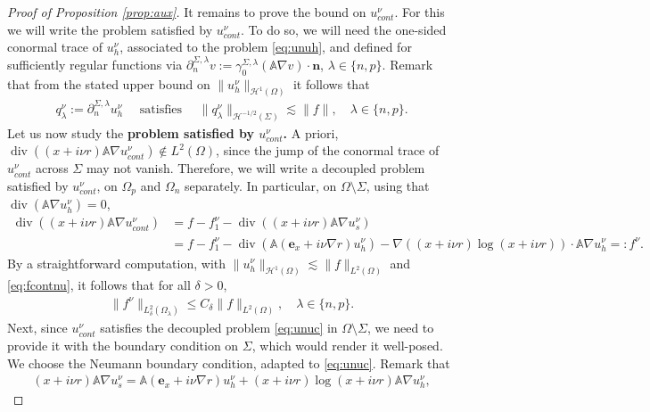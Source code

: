 \documentclass[report]{elsarticle}
\numberwithin{theorem}{section}
\renewcommand{\vec}[1]{\mathbf{#1}}
\begin{document}
\begin{proof}[Proof of Proposition \ref{prop:aux}]
	It remains to prove the bound on $u^{\nu}_{cont}$. For this we will write the problem satisfied by $u^{\nu}_{cont}$.  To do so, we will need the one-sided conormal trace of $u^{\nu}_h$, associated to the problem \eqref{eq:unuh}, and defined for sufficiently regular functions via $\partial_{n}^{\Sigma,\lambda}v:=\gamma_0^{\Sigma,\lambda}(\mathbb{A}\nabla v)\cdot \vec{n}$, $\lambda\in \{n,p\}$. Remark that from the stated upper bound on $\|u^{\nu}_h\|_{\mathcal{H}^1(\Omega)}$ it follows that
	\begin{align}
		\label{eq:conorm_der}
		q^{\nu}_{\lambda}:=\partial_{n}^{\Sigma,\lambda}u^{\nu}_h\quad \text{ satisfies }\quad
		\|q^{\nu}_{\lambda}\|_{\mathcal{H}^{-1/2}(\Sigma)}\lesssim \|f\|, \quad \lambda\in \{n,p\}.
	\end{align}
	Let us now study the \textbf{problem satisfied by $u^{\nu}_{cont}$.} A priori, $\operatorname{div}((x+i\nu r)\mathbb{A}\nabla u^{\nu}_{cont})\notin L^2(\Omega)$, since the jump of the conormal trace of $u^{\nu}_{cont}$ across $\Sigma$ may not vanish. Therefore, we will write a decoupled problem satisfied by $u^{\nu}_{cont}$, on $\Omega_p$ and $\Omega_n$ separately. In particular, on $\Omega\setminus \Sigma$, using that $\operatorname{div}(\mathbb{A}\nabla u^{\nu}_h)=0$, 
	\begin{align}
		\nonumber
		\operatorname{div}((x+i\nu r)\mathbb{A}\nabla u^{\nu}_{cont})&=f-f^{\nu}_{1}-\operatorname{div}((x+i\nu r)\mathbb{A}\nabla u^{\nu}_{s})\\
		\label{eq:unuc}
		&=f-f^{\nu}_{1}-\operatorname{div}(\mathbb{A}(\vec{e}_x+i\nu \nabla r)u^{\nu}_h)-\nabla((x+i\nu r)\log(x+i\nu r))\cdot \mathbb{A}\nabla u^{\nu}_h=:f^{\nu}.
	\end{align}
	By a straightforward computation, with  $\|u^{\nu}_h\|_{\mathcal{H}^1(\Omega)}\lesssim \|f\|_{L^2(\Omega)}$ and \eqref{eq:fcontnu}, it follows that for all $\delta>0$, \begin{align}
		\label{eq:rhs_bound}
		\|f^{\nu}\|_{L^2_{\delta}(\Omega_{\lambda} )}\leq C_{\delta}\|f\|_{L^2(\Omega)}, \quad \lambda\in \{n,p\}.
	\end{align}
	Next, since $u^{\nu}_{cont}$ satisfies the decoupled problem \eqref{eq:unuc} in $\Omega\setminus \Sigma$, we need to provide it with the boundary condition on $\Sigma$, which would render it well-posed. We choose the Neumann boundary condition, adapted to \eqref{eq:unuc}. Remark that 
	\begin{align*}
		(x+i\nu r)\mathbb{A}\nabla u^{\nu}_{s}=\mathbb{A}(\vec{e}_x+i\nu \nabla r)u^{\nu}_{h}+(x+i\nu r)\log(x+i\nu r)\mathbb{A}\nabla u^{\nu}_h, 

\end{align*}
\end{proof}
\end{document}
